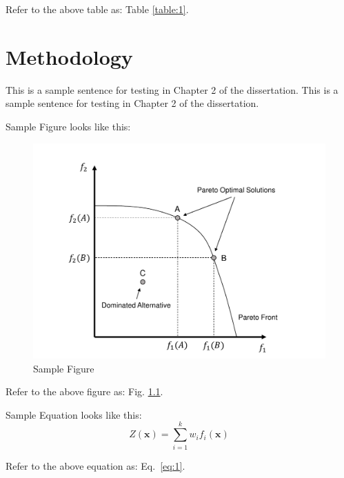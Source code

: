 \documentclass[oneside, phd]{snuthesis_utf8_eng}
\begin{document}
Refer to the above table as: Table \ref{table:1}.


\newpage
\chapter{Methodology}\label{c2}
This is a sample sentence for testing in Chapter 2 of the dissertation. This is a sample sentence for testing in Chapter 2 of the dissertation.  

Sample Figure looks like this:

\begin{figure}[p]\centering \begin{center}
 \includegraphics[scale=.50]{sample_fig.pdf}
 \end{center} \vfill
\caption{Sample Figure} 
\label{figure:1}
\end{figure}
\clearpage

Refer to the above figure as: Fig. \ref{figure:1}.


Sample Equation looks like this:
\begin{equation} \label{eq:1}
Z(\mathbf{x}) = \sum^{k}_{i=1} w_{i} f_{i}(\mathbf{x})
\end{equation}

Refer to the above equation as: Eq.~\ref{eq:1}.




\begin{bibpage}
\renewcommand{\bibname}{Bibliography}

\nocite{*}
\end{bibpage}
\end{document}
